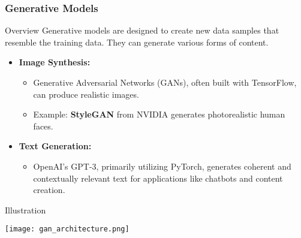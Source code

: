 \documentclass[aspectratio=169]{beamer}
\begin{document}
\begin{frame}
    \frametitle{Generative Models}
    \begin{block}{Overview}
        Generative models are designed to create new data samples that resemble the training data. They can generate various forms of content.
    \end{block}
    
    \begin{itemize}
        \item \textbf{Image Synthesis:} 
        \begin{itemize}
            \item Generative Adversarial Networks (GANs), often built with TensorFlow, can produce realistic images.
            \item Example: \textbf{StyleGAN} from NVIDIA generates photorealistic human faces.
        \end{itemize}
        
        \item \textbf{Text Generation:} 
        \begin{itemize}
            \item OpenAI's GPT-3, primarily utilizing PyTorch, generates coherent and contextually relevant text for applications like chatbots and content creation.
        \end{itemize}
    \end{itemize}
    
    \begin{block}{Illustration}
        \begin{center}
            \texttt{[image: gan\_architecture.png]}
        \end{center}
    \end{block}
\end{frame}
\end{document}
